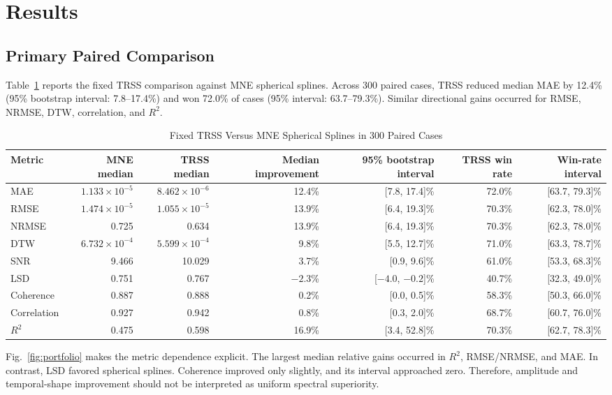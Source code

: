 \section{Results}
\subsection{Primary Paired Comparison}
Table~\ref{tab:primary} reports the fixed TRSS comparison against MNE spherical splines. Across 300 paired cases, TRSS reduced median MAE by 12.4\% (95\% bootstrap interval: 7.8--17.4\%) and won 72.0\% of cases (95\% interval: 63.7--79.3\%). Similar directional gains occurred for RMSE, NRMSE, DTW, correlation, and $R^2$.

\begin{table}[t]
\caption{Fixed TRSS Versus MNE Spherical Splines in 300 Paired Cases}
\label{tab:primary}
\centering
\small
\begin{tabular}{@{}lrrrrrr@{}}
\toprule
Metric & MNE median & TRSS median & Median improvement & 95\% bootstrap interval & TRSS win rate & Win-rate interval \\
\midrule
MAE & $1.133\!\times\!10^{-5}$ & $8.462\!\times\!10^{-6}$ & 12.4\% & [7.8, 17.4]\% & 72.0\% & [63.7, 79.3]\% \\
RMSE & $1.474\!\times\!10^{-5}$ & $1.055\!\times\!10^{-5}$ & 13.9\% & [6.4, 19.3]\% & 70.3\% & [62.3, 78.0]\% \\
NRMSE & 0.725 & 0.634 & 13.9\% & [6.4, 19.3]\% & 70.3\% & [62.3, 78.0]\% \\
DTW & $6.732\!\times\!10^{-4}$ & $5.599\!\times\!10^{-4}$ & 9.8\% & [5.5, 12.7]\% & 71.0\% & [63.3, 78.7]\% \\
SNR & 9.466 & 10.029 & 3.7\% & [0.9, 9.6]\% & 61.0\% & [53.3, 68.3]\% \\
LSD & 0.751 & 0.767 & $-2.3$\% & [$-4.0$, $-0.2$]\% & 40.7\% & [32.3, 49.0]\% \\
Coherence & 0.887 & 0.888 & 0.2\% & [0.0, 0.5]\% & 58.3\% & [50.3, 66.0]\% \\
Correlation & 0.927 & 0.942 & 0.8\% & [0.3, 2.0]\% & 68.7\% & [60.7, 76.0]\% \\
$R^2$ & 0.475 & 0.598 & 16.9\% & [3.4, 52.8]\% & 70.3\% & [62.7, 78.3]\% \\
\bottomrule
\end{tabular}
\end{table}

Fig.~\ref{fig:portfolio} makes the metric dependence explicit. The largest median relative gains occurred in $R^2$, RMSE/NRMSE, and MAE. In contrast, LSD favored spherical splines. Coherence improved only slightly, and its interval approached zero. Therefore, amplitude and temporal-shape improvement should not be interpreted as uniform spectral superiority.

